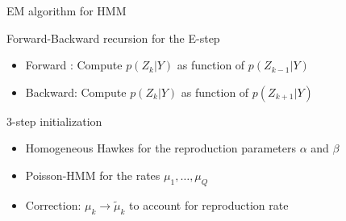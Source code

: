 \documentclass[french,english]{beamer}
\begin{document}
\begin{frame}{EM algorithm for HMM}

    \begin{block}{Forward-Backward recursion for the E-step}
        \begin{itemize}
            \item Forward : Compute $p(Z_{k}\vert Y)$ as function of $p(Z_{k-1}\vert Y)$ 
            \item Backward: Compute $p(Z_{k}\vert Y)$ as function of $p(Z_{k+1}\vert Y)$
        \end{itemize}
    \end{block}
    \vspace{-0.3cm}
\footnotesize
\begin{figure}
   \begin{centering}

\end{centering}
\end{figure}


  \vspace{-0.5cm}

   \begin{block}{3-step initialization}
       \begin{itemize}
          \item Homogeneous Hawkes for the reproduction parameters $\alpha$ and $\beta$
          \item Poisson-HMM for the rates $\mu_1, \dots, \mu_Q$
          \item Correction: $\mu_k \rightarrow \widetilde{\mu}_k$ to account for reproduction rate
      \end{itemize}
   \end{block}
      
\end{frame}
\end{document}
